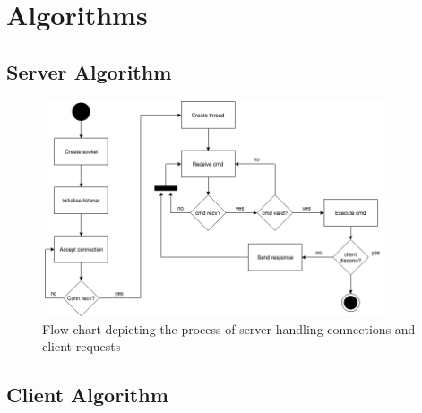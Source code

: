 \documentclass[10pt,twocolumn]{witseiepaper}
\begin{document}
\newpage
\setcounter{figure}{0} 
\renewcommand{\thefigure}
{A\arabic{figure}}
\onecolumn
\begin{appendix} \label{sec:appendix}

\section{Algorithms}

\subsection{Server Algorithm}
\begin{figure}[h]
	\centering
	\includegraphics[width=0.9\textwidth]{Server.png}
	\caption{Flow chart depicting the process of server handling connections and client requests}
	\raggedright
	\label{fig:server}	
\end{figure}

\subsection{Client Algorithm}


\end{appendix}
\end{document}
